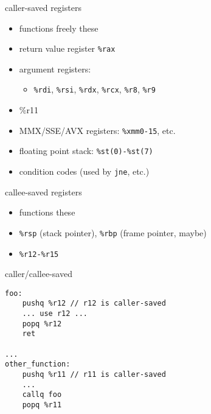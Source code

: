 
\begin{frame}{caller-saved registers}
    \begin{itemize}
        \item functions  freely  these
        \vspace{.5cm}
        \item return value register {\tt \%rax}
        \item argument registers: \\
            \begin{itemize}
            \item {\tt \%rdi}, {\tt \%rsi}, {\tt \%rdx}, 
              {\tt \%rcx}, {\tt \%r8}, {\tt \%r9}
              \end{itemize}
        \item \%r11
        \item MMX/SSE/AVX registers: {\tt \%xmm0-15}, etc.
        \item floating point stack: {\tt \%st(0)-\%st(7)}
        \item condition codes (used by {\tt jne}, etc.)
    \end{itemize}
\end{frame}

\begin{frame}[fragile,label=calleeSaved]{callee-saved registers}
    \begin{itemize}
    \item functions  these
    \vspace{.5cm}
    \item {\tt \%rsp} (stack pointer), {\tt \%rbp} (frame pointer, maybe)
    \item {\tt \%r12-\%r15}
    \end{itemize}
\end{frame}

\begin{frame}[fragile,label=callerCallee]{caller/callee-saved}
\lstset{style=small}
\begin{lstlisting}
foo:
    pushq %r12 // r12 is caller-saved
    ... use r12 ...
    popq %r12
    ret

...
other_function:
    pushq %r11 // r11 is caller-saved
    ...
    callq foo
    popq %r11
\end{lstlisting}
\end{frame}

